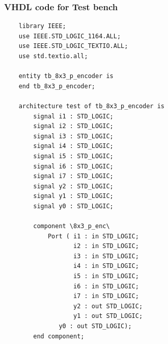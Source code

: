 \documentclass[12pt]{article}
\begin{document}
\subsubsection{VHDL code for Test bench}
\begin{verbatim}
    library IEEE;
    use IEEE.STD_LOGIC_1164.ALL;
    use IEEE.STD_LOGIC_TEXTIO.ALL;
    use std.textio.all;
    
    entity tb_8x3_p_encoder is
    end tb_8x3_p_encoder;
    
    architecture test of tb_8x3_p_encoder is
        signal i1 : STD_LOGIC;
        signal i2 : STD_LOGIC;
        signal i3 : STD_LOGIC;
        signal i4 : STD_LOGIC;
        signal i5 : STD_LOGIC;
        signal i6 : STD_LOGIC;
        signal i7 : STD_LOGIC;
        signal y2 : STD_LOGIC;
        signal y1 : STD_LOGIC;
        signal y0 : STD_LOGIC;
    
        component \8x3_p_enc\
            Port ( i1 : in STD_LOGIC;
                   i2 : in STD_LOGIC;
                   i3 : in STD_LOGIC;
                   i4 : in STD_LOGIC;
                   i5 : in STD_LOGIC;
                   i6 : in STD_LOGIC;
                   i7 : in STD_LOGIC;
                   y2 : out STD_LOGIC;
                   y1 : out STD_LOGIC;
    	       y0 : out STD_LOGIC);
        end component;
    

\end{verbatim}
\end{document}
